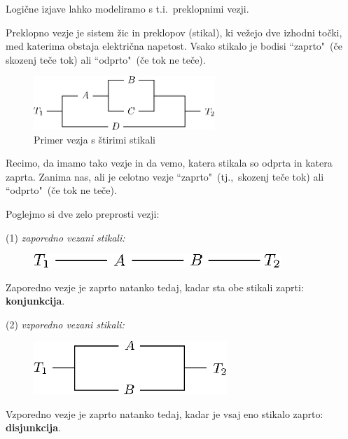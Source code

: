 \documentclass[12pt,a4paper]{article}
\begin{document}
Logične izjave lahko modeliramo s t.i.~preklopnimi vezji.

Preklopno vezje je sistem žic in preklopov (stikal), ki vežejo dve
izhodni točki, med katerima obstaja električna napetost.
Vsako stikalo je bodisi ``zaprto"~(če skozenj teče tok) ali
``odprto"~(če tok ne teče).

\begin{figure}[h!]
\begin{center}
\includegraphics[height=20mm]{vezje.eps}
\caption{Primer vezja s štirimi stikali}\label{fig:vezje}
\end{center}
\end{figure}

Recimo, da imamo tako vezje in da vemo, katera stikala so odprta in katera zaprta.
Zanima nas, ali je celotno vezje ``zaprto"~(tj.,~skozenj teče tok) ali ``odprto"~(če
tok ne teče).


Poglejmo si dve zelo preprosti vezji:

(1) {\em zaporedno vezani stikali:}

\begin{figure}[h!]
\begin{center}
\includegraphics[height=5mm]{vezje-zaporedno.eps}\label{fig:vezje-zap}
\end{center}
\end{figure}

Zaporedno vezje je zaprto natanko tedaj, kadar sta obe stikali zaprti: {\bf konjunkcija}.

(2) {\em vzporedno vezani stikali:}

\begin{figure}[h!]
\begin{center}
\includegraphics[height=20mm]{vezje-vzporedno.eps}\label{fig:vezje-vzp}
\end{center}
\end{figure}

Vzporedno vezje je zaprto natanko tedaj, kadar je vsaj eno stikalo zaprto:
{\bf disjunkcija}.
\end{document}
